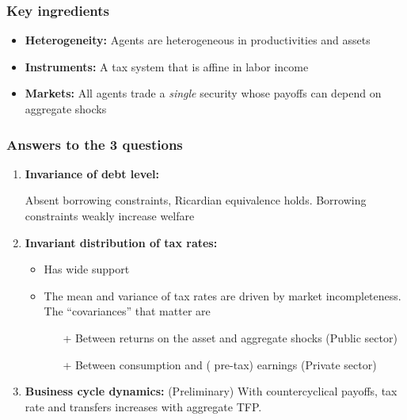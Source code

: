 \documentclass{beamer}
\begin{document}
\begin{frame}
\frametitle{Key ingredients}


\begin{itemize}
\vspace{3mm}
 \item \textbf{Heterogeneity:} Agents are heterogeneous in productivities and assets 

 \item \textbf{Instruments:} A tax system that is affine in labor income
 \vspace{3mm}
 \item \textbf{Markets:} All agents trade a \emph{single} security whose payoffs can depend on aggregate shocks
\end{itemize}


\end{frame}

\begin{frame}
 \frametitle{Answers to the 3 questions}
 
\begin{enumerate}
\item \textbf{Invariance of  debt level:} 

Absent borrowing constraints, Ricardian equivalence holds. Borrowing constraints weakly increase welfare

\item \textbf{Invariant distribution of tax rates:} 

\begin{itemize}
	\item Has wide support
       \item The mean and variance of tax rates are driven by market incompleteness. The ``covariances'' that matter are 
       \begin{itemize}
        \item [+]  Between returns on the asset and aggregate shocks (Public sector)
        \item [+]  Between consumption and (	
        pre-tax) earnings (Private sector)
       \end{itemize}
\end{itemize}



\item \textbf{Business cycle dynamics:} (Preliminary) 
With countercyclical payoffs, tax rate and transfers increases with aggregate TFP.
\end{enumerate}



\end{frame}
\end{document}
